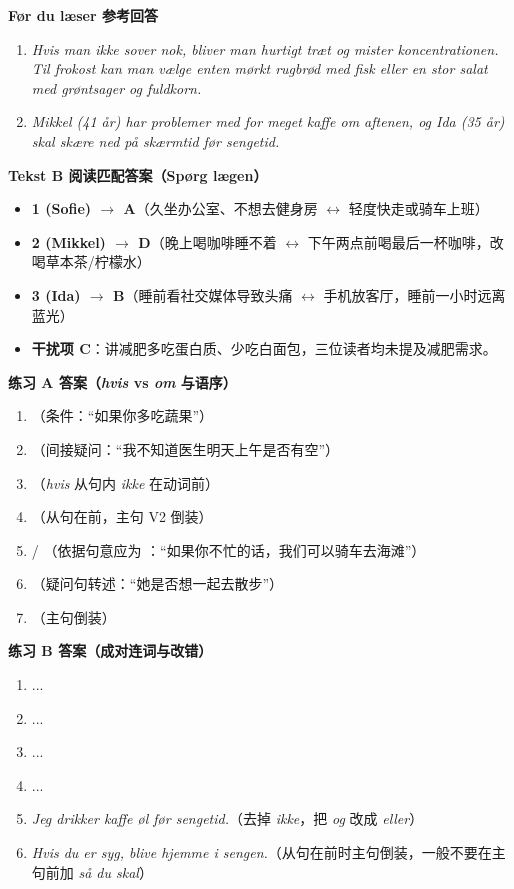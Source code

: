 \begin{answerbox}
\textbf{Før du læser 参考回答}
\begin{enumerate}
  \item \textit{Hvis man ikke sover nok, bliver man hurtigt træt og mister koncentrationen. Til frokost kan man vælge enten mørkt rugbrød med fisk eller en stor salat med grøntsager og fuldkorn.}
  \item \textit{Mikkel (41 år) har problemer med for meget kaffe om aftenen, og Ida (35 år) skal skære ned på skærmtid før sengetid.}
\end{enumerate}

\textbf{Tekst B 阅读匹配答案（Spørg lægen）}
\begin{itemize}
  \item \textbf{1 (Sofie) $\rightarrow$ A}（久坐办公室、不想去健身房 $\leftrightarrow$ 轻度快走或骑车上班）
  \item \textbf{2 (Mikkel) $\rightarrow$ D}（晚上喝咖啡睡不着 $\leftrightarrow$ 下午两点前喝最后一杯咖啡，改喝草本茶/柠檬水）
  \item \textbf{3 (Ida) $\rightarrow$ B}（睡前看社交媒体导致头痛 $\leftrightarrow$ 手机放客厅，睡前一小时远离蓝光）
  \item \textbf{干扰项 C}：讲减肥多吃蛋白质、少吃白面包，三位读者均未提及减肥需求。
\end{itemize}

\textbf{练习 A 答案（\textit{hvis} vs \textit{om} 与语序）}
\begin{enumerate}
  \item {}（条件：“如果你多吃蔬果”）
  \item {}（间接疑问：“我不知道医生明天上午是否有空”）
  \item {}（\textit{hvis} 从句内 \textit{ikke} 在动词前）
  \item {}（从句在前，主句 V2 倒装）
  \item {} / （依据句意应为 ：“如果你不忙的话，我们可以骑车去海滩”）
  \item {}（疑问句转述：“她是否想一起去散步”）
  \item {}（主句倒装）
\end{enumerate}

\textbf{练习 B 答案（成对连词与改错）}
\begin{enumerate}
  \item {} ... 
  \item {} ... 
  \item {} ... 
  \item {} ... 
  \item \textit{Jeg drikker  kaffe  øl før sengetid.}（去掉 \textit{ikke}，把 \textit{og} 改成 \textit{eller}）
  \item \textit{Hvis du er syg,  blive hjemme i sengen.}（从句在前时主句倒装，一般不要在主句前加 \textit{så du skal}）
\end{enumerate}


\end{answerbox}
